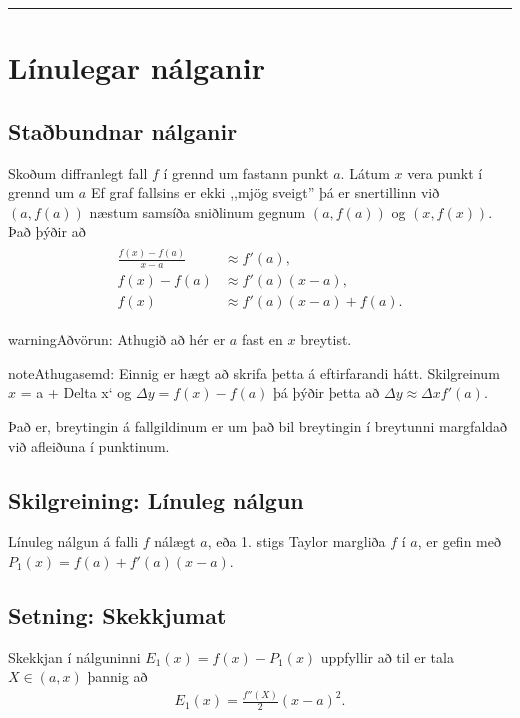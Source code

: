 \documentclass[a4paper,10pt,icelandic]{sphinxmanual}
\begin{document}
\bigskip\hrule\bigskip



\section{Línulegar nálganir}
\label{\detokenize{kafli03:linulegar-nalganir}}

\subsection{Staðbundnar nálganir}
\label{\detokenize{kafli03:stabundnar-nalganir}}
Skoðum diffranlegt fall \(f\) í grennd um fastann punkt
\(a\). Látum \(x\) vera punkt í grennd um \(a\)
Ef graf fallsins er ekki ,,mjög
sveigt” þá er snertillinn við \((a,f(a))\) næstum samsíða
sniðlinum gegnum \((a,f(a))\) og \((x,f(x))\).
Það þýðir að
\begin{equation*}
\begin{split}\begin{aligned}
     \frac{f(x)-f(a)}{x-a} &\approx f'(a),\\
     f(x)-f(a) &\approx  f'(a)(x-a),\\
     f(x) &\approx f'(a)(x-a) + f(a).
\end{aligned}\end{split}
\end{equation*}
\begin{sphinxadmonition}{warning}{Aðvörun:}
Athugið að hér er \(a\) fast en \(x\) breytist.
\end{sphinxadmonition}

\begin{sphinxadmonition}{note}{Athugasemd:}
Einnig er hægt að skrifa þetta á eftirfarandi hátt.
Skilgreinum \(x\) = a + Delta x{}` og
\(\Delta y = f(x) - f(a)\) þá þýðir þetta að
\(\Delta y \approx \Delta x f'(a)\).

Það er, breytingin á fallgildinum er um það bil breytingin í
breytunni margfaldað við afleiðuna í punktinum.
\end{sphinxadmonition}


\subsection{Skilgreining: Línuleg nálgun}
\label{\detokenize{kafli03:skilgreining-linuleg-nalgun}}
Línuleg nálgun á falli \(f\) nálægt \(a\), eða 1. stigs Taylor
margliða \(f\) í \(a\), er gefin með
\(P_1(x)=f(a)+f'(a)(x-a)\).


\subsection{Setning: Skekkjumat}
\label{\detokenize{kafli03:setning-skekkjumat}}
Skekkjan í nálguninni \(E_1(x)=f(x)-P_1(x)\) uppfyllir að til er
tala \(X \in (a,x)\) þannig að
\begin{equation*}
\begin{split}E_1(x)=\frac{f''(X)}{2}(x-a)^2.\end{split}
\end{equation*}
\end{document}
